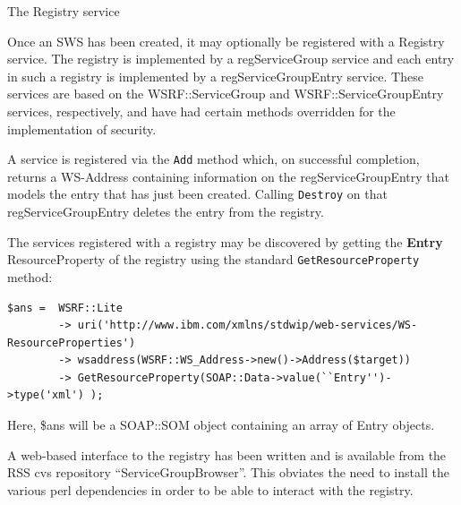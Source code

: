 \documentclass[a4paper]{article}
\begin{document}

\begin{section}{The Registry service}
\label{sec:registry_service}

Once an SWS has been created, it may optionally be registered with a
Registry service.  The registry is implemented by a regServiceGroup
service and each entry in such a registry is implemented by a
regServiceGroupEntry service.  These services are based on the
WSRF::ServiceGroup and WSRF::ServiceGroupEntry services, respectively,
and have had certain methods overridden for the implementation of
security.

A service is registered via the \texttt{Add} method which, on
successful completion, returns a WS-Address containing information on
the regServiceGroupEntry that models the entry that has just been
created.  Calling \texttt{Destroy} on that regServiceGroupEntry
deletes the entry from the registry.

The services registered with a registry may be discovered by getting
the {\bf Entry} ResourceProperty of the registry using the standard
\texttt{GetResourceProperty} method:
\begin{verbatim}
$ans =  WSRF::Lite
        -> uri('http://www.ibm.com/xmlns/stdwip/web-services/WS-ResourceProperties')
        -> wsaddress(WSRF::WS_Address->new()->Address($target))
        -> GetResourceProperty(SOAP::Data->value(``Entry'')->type('xml') );
\end{verbatim}
Here, \$ans will be a SOAP::SOM object containing an array of Entry 
objects.

A web-based interface to the registry has been written and is available
from the RSS cvs repository ``ServiceGroupBrowser''.  This obviates the
need to install the various perl dependencies in order to be able to 
interact with the registry.

\end{section}

\end{document}
